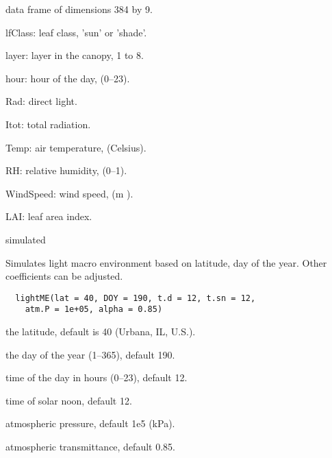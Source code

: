 \documentclass[letterpaper]{book}
\begin{document}
%
\begin{Format}
data frame of dimensions 384 by 9.
\end{Format}
%
\begin{Details}\relax
lfClass: leaf class, 'sun' or 'shade'.

layer: layer in the canopy, 1 to 8.

hour: hour of the day, (0--23).

Rad: direct light.

Itot: total radiation.

Temp: air temperature, (Celsius).

RH: relative humidity, (0--1).

WindSpeed: wind speed, (m ).

LAI: leaf area index.
\end{Details}
%
\begin{Source}\relax
simulated
\end{Source}
%
\begin{Description}\relax
Simulates light macro environment based on latitude, day
of the year. Other coefficients can be adjusted.
\end{Description}
%
\begin{Usage}
\begin{verbatim}
  lightME(lat = 40, DOY = 190, t.d = 12, t.sn = 12,
    atm.P = 1e+05, alpha = 0.85)
\end{verbatim}
\end{Usage}
%
\begin{Arguments}
\begin{ldescription}
\item[\code{lat}] the latitude, default is 40 (Urbana, IL,
U.S.).

\item[\code{DOY}] the day of the year (1--365), default 190.

\item[\code{t.d}] time of the day in hours (0--23), default 12.

\item[\code{t.sn}] time of solar noon, default 12.

\item[\code{atm.P}] atmospheric pressure, default 1e5 (kPa).

\item[\code{alpha}] atmospheric transmittance, default 0.85.
\end{ldescription}
\end{Arguments}
\end{document}
